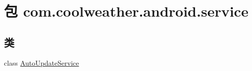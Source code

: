 \hypertarget{namespacecom_1_1coolweather_1_1android_1_1service}{}\section{包 com.\+coolweather.\+android.\+service}
\label{namespacecom_1_1coolweather_1_1android_1_1service}
\subsection*{类}
\begin{DoxyCompactItemize}
\item 
class \mbox{\hyperlink{classcom_1_1coolweather_1_1android_1_1service_1_1_auto_update_service}{Auto\+Update\+Service}}
\end{DoxyCompactItemize}
